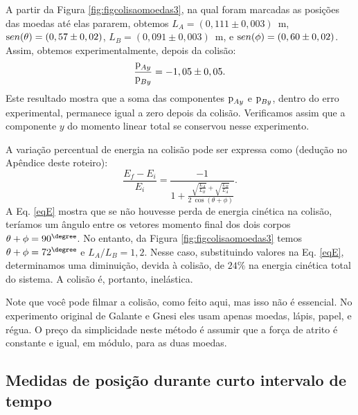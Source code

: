 A partir da Figura \ref{fig:figcolisaomoedas3}, na qual foram marcadas as posições das moedas até elas pararem, obtemos 
$L_A=(0,111 \pm 0,003)$~m, 
${\text sen}(\theta)=(0,57 \pm 0,02)$, 
$L_B=(0,091 \pm 0,003)$~m, 
e ${\text sen}(\phi)=(0,60 \pm 0,02)$. 
Assim, obtemos experimentalmente, depois da colisão:
\begin{equation}
\frac{{\text p}_{Ay}} {{\text p}_{By}} = - 1,05 \pm 0,05.
\end{equation}
Este resultado mostra que a soma das componentes ${\text p}_{Ay}$ e ${\text p}_{By}$, dentro do erro experimental, permanece igual a zero depois da colisão. Verificamos assim que a componente $y$ do momento linear total se conservou nesse experimento.

A variação percentual de energia na colisão pode ser expressa como (dedução no Apêndice deste roteiro):
\begin{equation}
\frac{E_f - E_i}{E_i} = \frac{-1}{1+ \displaystyle {\frac{\sqrt{\frac{L_A}{L_B}}+\sqrt{\frac{L_B}{L_A}}}{2~ \cos(\theta+\phi)}}}.
\label{eqE}
\end{equation}
A Eq. \ref{eqE} mostra que se não houvesse perda de energia cinética na colisão, teríamos um ângulo entre os vetores momento final dos dois corpos $\theta+\phi=90^{\degree}$. No entanto,
da Figura \ref{fig:figcolisaomoedas3} temos $\theta+\phi= 72^{\degree}$ e $L_A/L_B=1,2$. Nesse caso, substituindo valores na Eq. \ref{eqE}, determinamos uma diminuição, devida à colisão, de $24\%$ na energia cinética total do sistema. A colisão é, portanto, inelástica. 

Note que você pode filmar a colisão, como feito aqui, mas isso não é essencial. No experimento original de Galante e Gnesi eles usam apenas moedas, lápis, papel, e régua. O preço da simplicidade neste método é assumir que a força de atrito é constante e igual, em módulo, para as duas moedas. 


\subsection{ Medidas de posição durante curto intervalo de tempo}

